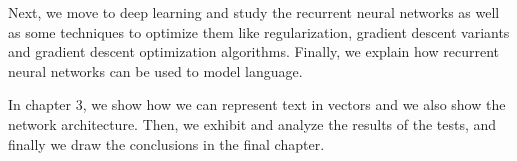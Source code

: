 Next, we move to deep learning and study the recurrent neural networks as well as some techniques to optimize them like regularization, gradient descent variants and gradient descent optimization algorithms. Finally, we explain how recurrent neural networks can be used to model language. 

In  chapter 3, we show how we can represent text  in vectors and we also show the network architecture. Then, we exhibit and analyze  the results of the tests, and finally we draw the conclusions in the final chapter.

